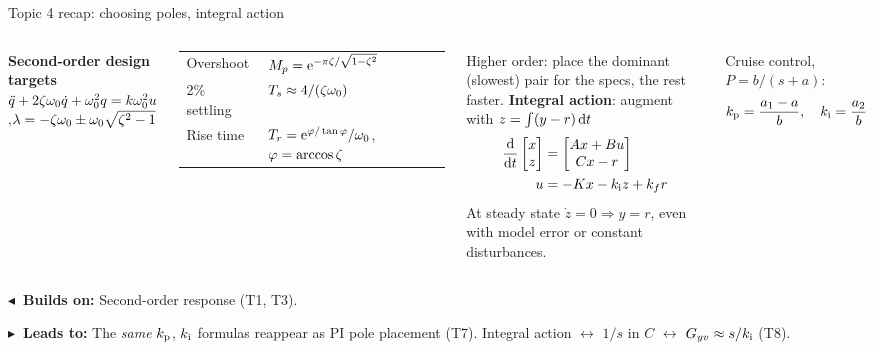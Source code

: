 \documentclass[10pt]{beamer-control}
\newcommand\LINKS[2]{%
  \par\vfill
  {\scriptsize\setlength\fboxsep{3pt}%
  \colorbox{AUHighlight!10}{\parbox{\dimexpr\linewidth-6pt\relax}{%
    \textbf{\color{AUHighlight}$\blacktriangleleft$~Builds on:} #1\par
    \textbf{\color{AUHighlight}$\blacktriangleright$~Leads to:} #2%
    \hfill\hyperlink{coursemap}{\beamerbutton{Course map}}}}}%
}
\begin{document}
\begin{frame}{Topic 4 recap: choosing poles, integral action}
  \begin{columns}[t]
    \footnotesize
    \textbf{Second-order design targets}\\
    $\ddot q + 2\zeta\omega_0\dot q + \omega_0^2 q = k\omega_0^2 u$,\quad $\lambda = -\zeta\omega_0 \pm \omega_0\sqrt{\zeta^2-1}$
    \par\smallskip
    \renewcommand\arraystretch{1.3}
    \begin{tabular}{@{}ll@{}}
      \toprule
      Overshoot & $M_p = \mathrm{e}^{-\pi\zeta/\sqrt{1-\zeta^2}}$\\
      2\% settling & $T_s \approx 4/(\zeta\omega_0)$\\
      Rise time & $T_r = \mathrm{e}^{\varphi/\tan\varphi}/\omega_0$, $\varphi=\arccos\zeta$\\
      \bottomrule
    \end{tabular}
    \par\smallskip
    Higher order: place the \alert{dominant} (slowest) pair for the specs, the rest faster.
    \footnotesize
    \textbf{Integral action}: augment with $z = \int (y-r)\,\mathrm{d} t$
    \begin{align*}
      \frac{\mathrm{d} }{\mathrm{d} t}\begin{bmatrix}x\\z\end{bmatrix} &= \begin{bmatrix}Ax+Bu\\ Cx-r\end{bmatrix}\\
      u &= -Kx - k_{\mathrm{i}} z + k_f r
    \end{align*}
    At steady state $\dot z = 0 \Rightarrow y = r$, even with model error or constant disturbances.
    \par\smallskip
    Cruise control, $P = b/(s+a)$:
    \begin{align*}
      k_{\mathrm{p}} = \frac{a_1 - a}{b}, \quad k_{\mathrm{i}} = \frac{a_2}{b}
    \end{align*}
  \end{columns}
  \LINKS{Second-order response (T1, T3).}{The \emph{same} $k_{\mathrm{p}}$, $k_{\mathrm{i}}$ formulas reappear as PI pole placement (T7). Integral action $\leftrightarrow$ $1/s$ in $C$ $\leftrightarrow$ $G_{yv}\approx s/k_{\mathrm{i}}$ (T8).}
\end{frame}
\end{document}
